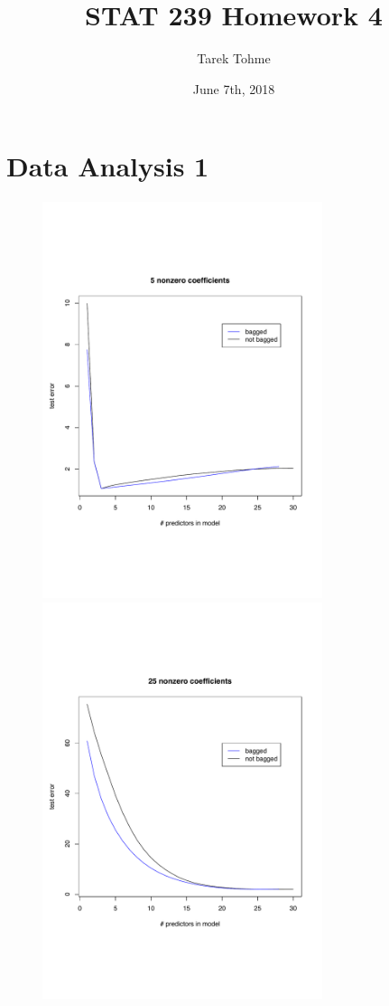 \documentclass{article}
\begin{document}
\title{STAT 239 Homework 4}
\author{Tarek Tohme}
\date{June 7th, 2018}
\maketitle

\section*{Data Analysis 1}

\paragraph{} 
\begin{figure}[h]				%
	\centering
	\includegraphics[width=8.2cm]{DA1/5.pdf}
	\includegraphics[width=8.2cm]{DA1/25.pdf}
	\caption{}
\end{figure}
\end{document}
